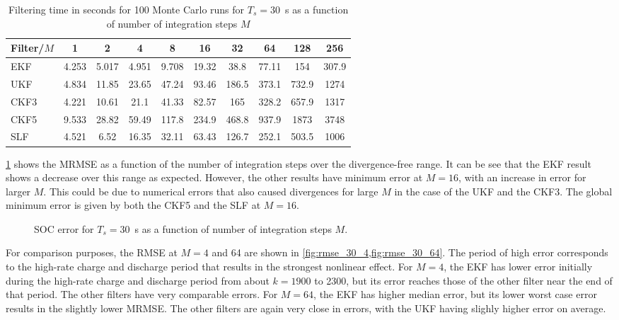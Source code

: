 \documentclass[../zhang_thesis.tex]{subfiles}
\begin{document}
\begin{table}[h]
\centering
\caption{Filtering time in seconds for 100 Monte Carlo runs for $T_s=30$~s as a function of number of integration steps $M$}
\begin{tabular}{@{}lccccccccc@{}}
\toprule
Filter/$M$ & 1     & 2     & 4     & 8     & 16    & 32    & 64    & 128   & 256   \\ \midrule
EKF        & 4.253 & 5.017 & 4.951 & 9.708 & 19.32 & 38.8  & 77.11 & 154   & 307.9 \\
UKF        & 4.834 & 11.85 & 23.65 & 47.24 & 93.46 & 186.5 & 373.1 & 732.9 & 1274  \\
CKF3       & 4.221 & 10.61 & 21.1  & 41.33 & 82.57 & 165   & 328.2 & 657.9 & 1317  \\
CKF5       & 9.533 & 28.82 & 59.49 & 117.8 & 234.9 & 468.8 & 937.9 & 1873  & 3748  \\
SLF        & 4.521 & 6.52  & 16.35 & 32.11 & 63.43 & 126.7 & 252.1 & 503.5 & 1006  \\ \bottomrule
\end{tabular}
\label{tab:time_30}
\end{table}

\cref{fig:mrmse_30} shows the MRMSE as a function of the number of integration steps over the divergence-free range. It can be see that the EKF result shows a decrease over this range as expected. However, the other results have minimum error at $M=16$, with an increase in error for larger $M$. This could be due to numerical errors that also caused divergences for large $M$ in the case of the UKF and the CKF3. The global minimum error is given by both the CKF5 and the SLF at $M=16$.

\begin{figure}[ht]
\centering
%
\caption{SOC error for $T_s=30$~s as a function of number of integration steps $M$.}
\label{fig:mrmse_30}
\end{figure}

For comparison purposes, the RMSE at $M=4$ and 64 are shown in \cref{fig:rmse_30_4,fig:rmse_30_64}. The period of high error corresponds to the high-rate charge and discharge period that results in the strongest nonlinear effect. For $M=4$, the EKF has lower error initially during the high-rate charge and discharge period from about $k=1900$ to 2300, but its error reaches those of the other filter near the end of that period. The other filters have very comparable errors. For $M=64$, the EKF has higher median error, but its lower worst case error results in the slightly lower MRMSE. The other filters are again very close in errors, with the UKF having slighly higher error on average.
\end{document}
